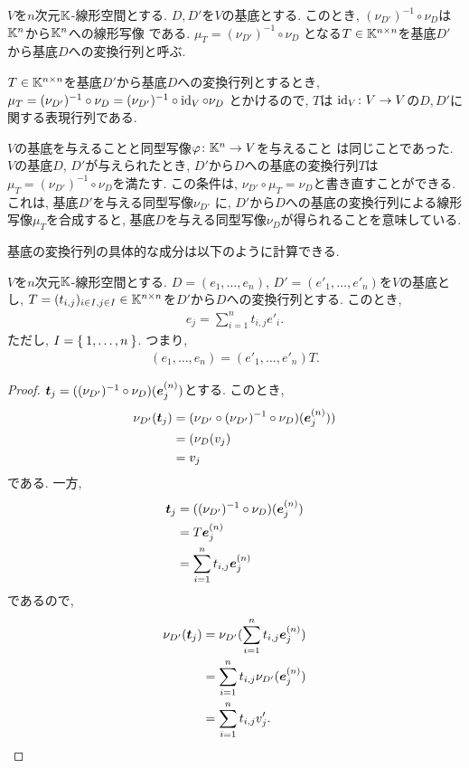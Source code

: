 \begin{definition}
  $V$を$n$次元$\mathbb{K}$-線形空間とする.
  $D,D'$を$V$の基底とする.
  このとき, $(\nu_{D'})^{-1}\circ\nu_{D}$は$\mathbb{K}^n$から$\mathbb{K}^n$への線形写像
  である.
  $\mu_T=(\nu_{D'})^{-1}\circ\nu_{D}$
  となる$T\in\mathbb{K}^{n\times n}$を基底$D'$から基底$D$への変換行列と呼ぶ.
\end{definition}
\begin{remark}
  $T\in\mathbb{K}^{n\times n}$を基底$D'$から基底$D$への変換行列とするとき,
  $\mu_T=(\nu_{D'})^{-1}\circ\nu_{D}=(\nu_{D'})^{-1}\circ\operatorname{id}_{V}\circ\nu_{D}$
  とかけるので,
  $T$は
  $\operatorname{id}_{V}\colon V\to V$の$D,D'$に関する表現行列である.
\end{remark}

\begin{remark}
  $V$の基底を与えることと同型写像$\varphi\colon \mathbb{K}^n\to V$を与えること
  は同じことであった.
  $V$の基底$D$, $D'$が与えられたとき, $D'$から$D$への基底の変換行列$T$は
  $\mu_T=(\nu_{D'})^{-1}\circ\nu_{D}$を満たす.
  この条件は,
  $\nu_{D'}\circ\mu_T=\nu_{D}$と書き直すことができる.
  これは,
  基底$D'$を与える同型写像$\nu_{D'}$
  に, $D'$から$D$への基底の変換行列による線形写像$\mu_T$を合成すると,
  基底$D$を与える同型写像$\nu_{D}$が得られることを意味している.
\end{remark}
基底の変換行列の具体的な成分は以下のように計算できる.
\begin{prop}
  \label{thm:trasmat:description}
  $V$を$n$次元$\mathbb{K}$-線形空間とする.
  $D=(e_1,\ldots, e_n)$,
  $D'=(e'_1,\ldots, e'_n)$を$V$の基底とし,
  $T=(t_{i,j})_{i\in I, j\in I}\in\mathbb{K}^{n\times n}$を$D'$から$D$への変換行列とする.
  このとき,
  \begin{align*}
    e_j=\sum_{i=1}^n t_{i,j}e'_i.
  \end{align*}
  ただし, $I=\Set{1,\ldots, n} $.
  つまり,
  \begin{align*}
    (e_1,\ldots, e_n)=(e'_1,\ldots, e'_n)T.
  \end{align*}
\end{prop}
\begin{proof}
  $\boldsymbol{t}_j=((\nu_{D'})^{-1}\circ\nu_{D})(\boldsymbol{e}^{(n)}_j)$とする.
  このとき,
  \begin{align*}
     \nu_{D'}(\boldsymbol{t}_j)
    &=(\nu_{D'}\circ(\nu_{D'})^{-1}\circ\nu_{D})(\boldsymbol{e}^{(n)}_j))\\
    &=(\nu_{D}(v_j)\\
    &=v_j
  \end{align*}
  である.
  一方,
  \begin{align*}
    \boldsymbol{t}_j&=((\nu_{D'})^{-1}\circ\nu_{D})(\boldsymbol{e}^{(n)}_j)\\
    &=T\boldsymbol{e}^{(n)}_j\\
    &=\sum_{i=1}^n t_{i,j}\boldsymbol{e}^{(n)}_j
  \end{align*}
  であるので,
  \begin{align*}
    \nu_{D'}(\boldsymbol{t}_j)
    &=\nu_{D'}(\sum_{i=1}^n t_{i,j}\boldsymbol{e}^{(n)}_j)\\
    &=\sum_{i=1}^n t_{i,j}\nu_{D'}(\boldsymbol{e}^{(n)}_j)\\
    &=\sum_{i=1}^n t_{i,j}v'_j.
  \end{align*}
\end{proof}

